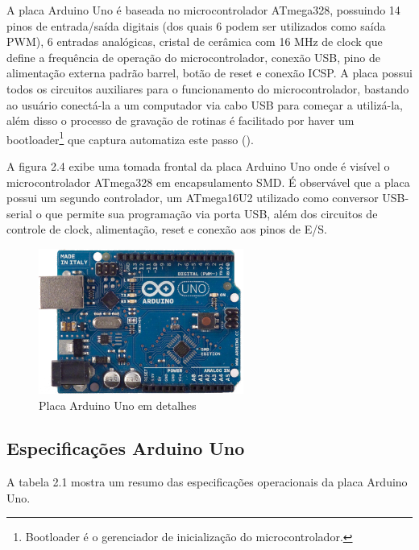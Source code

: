 A placa Arduino Uno é baseada no microcontrolador ATmega328, possuindo 14 pinos de entrada/saída digitais (dos quais 6 podem ser utilizados como saída PWM), 6 entradas analógicas, cristal de cerâmica com 16 MHz de clock que define a frequência de operação do microcontrolador, conexão USB, pino de alimentação externa padrão barrel, botão de reset e conexão ICSP. A placa possui todos os circuitos auxiliares para o funcionamento do microcontrolador, bastando ao usuário conectá-la a um computador via cabo USB para começar a utilizá-la, além disso o processo de gravação de rotinas é facilitado por haver um bootloader\footnote{Bootloader é o gerenciador de inicialização do microcontrolador.} que captura automatiza este passo (\textcite{arduino_specs:2013}).

A figura 2.4 exibe uma tomada frontal da placa Arduino Uno onde é visível o microcontrolador ATmega328 em encapsulamento SMD. É observável que a placa possui um segundo controlador, um ATmega16U2 utilizado como conversor USB-serial o que permite sua programação via porta USB, além dos circuitos de controle de clock, alimentação, reset e conexão aos pinos de E/S.

\begin{figure}[h!]
			\centering
			\includegraphics[width=0.6\textwidth]{figures/arduinoUnoFront.jpg}
			\caption{Placa Arduino Uno em detalhes}
			\label{1}
\end{figure}


\subsection{Especificações Arduino Uno}

A tabela 2.1 mostra um resumo das especificações operacionais da placa Arduino Uno.

